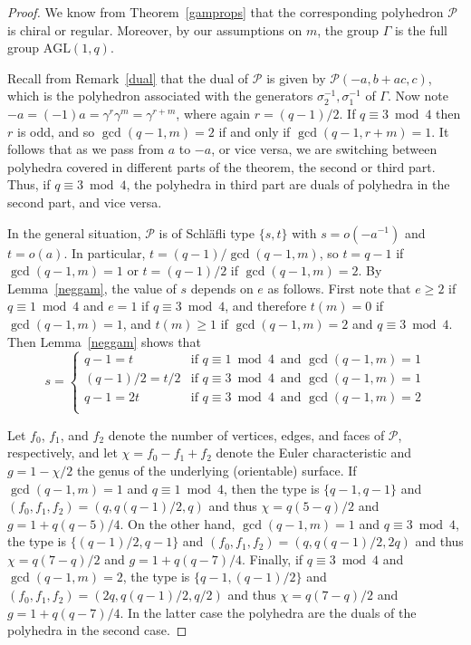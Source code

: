 \documentclass[12pt]{article}
\theoremstyle{definition}\newtheorem{definition}{Definition}[section]
\begin{document}
\begin{proof}
We know from Theorem~\ref{gamprops} that the corresponding polyhedron $\mathcal{P}$ is chiral or regular.  Moreover, by our assumptions on $m$, the group $\Gamma$ is the full group $\mathrm{AGL}(1,q)$. 

Recall from Remark~\ref{dual} that the dual of $\mathcal{P}$ is given by $\mathcal{P}(-a,b+ac,c)$, which is the polyhedron associated with the generators $\sigma_2^{-1},\sigma_1^{-1}$ of $\Gamma$. Now note $-a=(-1)a=\gamma^{r}\gamma^m=\gamma^{r+m}$, where again $r=(q-1)/2$. If $q\equiv 3 \bmod 4$ then $r$ is odd, and so $\gcd(q-1,m)=2$ if and only if $\gcd(q-1,r+m)=1$. It follows that as we pass from $a$ to $-a$, or vice versa, we are switching between polyhedra covered in different parts of the theorem, the second or third part. Thus, if $q\equiv 3 \bmod 4$, the polyhedra in third part are duals of polyhedra in the second part, and vice versa.

In the general situation, $\mathcal{P}$ is of Schl\"afli type $\{s,t\}$ with $s=o(-a^{-1})$ and $t=o(a)$. In particular, $t=(q-1)/\gcd(q-1,m)$, so $t=q-1$ if $\gcd(q-1,m)=1$ or $t=(q-1)/2$ if $\gcd(q-1,m)=2$. By Lemma~\ref{neggam}, the value of $s$ depends on $e$ as follows. First note that $e\geq 2$ if $q\equiv 1 \bmod 4$ and $e=1$ if $q\equiv 3 \bmod 4$, and therefore $t(m)=0$ if $\gcd(q-1,m)=1$, and $t(m)\geq 1$ if $\gcd(q-1,m)=2$ and $q\equiv 3 \bmod 4$. Then  Lemma~\ref{neggam} shows that 
\[s= \left\{\begin{array}{ll}
q-1=t & \mbox{if } q\equiv 1 \bmod 4\, \mbox{ and } \gcd(q-1,m)=1  \\ 
(q-1)/2=t/2 & \mbox{if } q\equiv 3 \bmod 4\, \mbox{ and } \gcd(q-1,m)=1 \\  
q-1=2t &  \mbox{if } q\equiv 3 \bmod 4\, \mbox{ and } \gcd(q-1,m)=2  \\
\end{array}\right. \]

Let $f_0$, $f_1$, and $f_2$ denote the number of vertices, edges, and faces of $\mathcal{P}$, respectively, and let $\chi = f_{0}-f_{1}+f_2$ denote the Euler characteristic and $g = 1-\chi/2$ the genus of the underlying (orientable) surface. If $\gcd(q-1,m)=1$ and $q\equiv 1 \bmod 4$, then the type is $\{q-1,q-1\}$ and $(f_0,f_1,f_2)=(q,q(q-1)/2,q)$ and thus $\chi=q(5-q)/2$ and $g=1+q(q-5)/4$. On the other hand, $\gcd(q-1,m)=1$ and $q\equiv 3 \bmod 4$, the type is $\{(q-1)/2,q-1\}$ and $(f_0,f_1,f_2)=(q,q(q-1)/2,2q)$ and thus $\chi=q(7-q)/2$ and $g=1+q(q-7)/4$. Finally, if $q\equiv 3\bmod 4$ and ${\gcd(q-1,m)=2}$, the type is $\{q-1,(q-1)/2\}$ and 
$(f_0,f_1,f_2)=(2q,q(q-1)/2,q/2)$ and thus $\chi=q(7-q)/2$ and $g=1+q(q-7)/4$. In the latter case the polyhedra are the duals of the polyhedra in the second case.


\end{proof}
\end{document}

